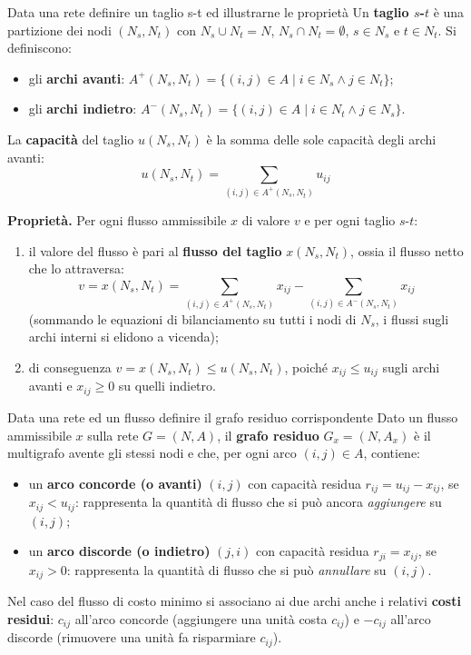 \documentclass[12pt]{extarticle} %
\begin{document}
\begin{teoriabox}{Data una rete definire un taglio s-t ed illustrarne le proprietà}
Un \textbf{taglio $s$-$t$} è una partizione dei nodi $(N_s, N_t)$ con $N_s \cup N_t = N$, $N_s \cap N_t = \emptyset$, $s \in N_s$ e $t \in N_t$. Si definiscono:
\begin{itemize}
    \item gli \textbf{archi avanti}: $A^+(N_s, N_t) = \{(i, j) \in A \mid i \in N_s \wedge j \in N_t\}$;
    \item gli \textbf{archi indietro}: $A^-(N_s, N_t) = \{(i, j) \in A \mid i \in N_t \wedge j \in N_s\}$.
\end{itemize}
La \textbf{capacità} del taglio $u(N_s, N_t)$ è la somma delle sole capacità degli archi avanti:
\[
u(N_s, N_t) = \sum_{(i,j) \in A^+(N_s, N_t)} u_{ij}
\]

\noindent\textbf{Proprietà.} Per ogni flusso ammissibile $x$ di valore $v$ e per ogni taglio $s$-$t$:
\begin{enumerate}
    \item il valore del flusso è pari al \textbf{flusso del taglio} $x(N_s, N_t)$, ossia il flusso netto che lo attraversa:
    \[
    v = x(N_s, N_t) = \sum_{(i,j) \in A^+(N_s, N_t)} x_{ij} - \sum_{(i,j) \in A^-(N_s, N_t)} x_{ij}
    \]
    (sommando le equazioni di bilanciamento su tutti i nodi di $N_s$, i flussi sugli archi interni si elidono a vicenda);
    \item di conseguenza $v = x(N_s, N_t) \le u(N_s, N_t)$, poiché $x_{ij} \le u_{ij}$ sugli archi avanti e $x_{ij} \ge 0$ su quelli indietro.
\end{enumerate}
\end{teoriabox}


\begin{teoriabox}{Data una rete ed un flusso definire il grafo residuo corrispondente}
Dato un flusso ammissibile $x$ sulla rete $G=(N,A)$, il \textbf{grafo residuo} $G_x = (N, A_x)$ è il multigrafo avente gli stessi nodi e che, per ogni arco $(i,j) \in A$, contiene:
\begin{itemize}
    \item un \textbf{arco concorde (o avanti)} $(i,j)$ con capacità residua $r_{ij} = u_{ij} - x_{ij}$, se $x_{ij} < u_{ij}$: rappresenta la quantità di flusso che si può ancora \textit{aggiungere} su $(i,j)$;
    \item un \textbf{arco discorde (o indietro)} $(j,i)$ con capacità residua $r_{ji} = x_{ij}$, se $x_{ij} > 0$: rappresenta la quantità di flusso che si può \textit{annullare} su $(i,j)$.
\end{itemize}
Nel caso del flusso di costo minimo si associano ai due archi anche i relativi \textbf{costi residui}: $c_{ij}$ all'arco concorde (aggiungere una unità costa $c_{ij}$) e $-c_{ij}$ all'arco discorde (rimuovere una unità fa risparmiare $c_{ij}$).
\end{teoriabox}
\end{document}
